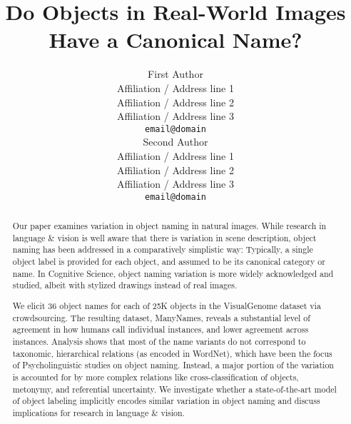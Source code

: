 \documentclass[11pt,a4paper]{article}
\title{Do Objects in Real-World Images Have a Canonical Name?}
\author{First Author \\
  Affiliation / Address line 1 \\
  Affiliation / Address line 2 \\
  Affiliation / Address line 3 \\
  {\tt email@domain} \\\And
  Second Author \\
  Affiliation / Address line 1 \\
  Affiliation / Address line 2 \\
  Affiliation / Address line 3 \\
  {\tt email@domain} \\}
\date{}
\newcommand{\cs}[1]{\textcolor{green}{\emph{//cs: #1//}}}
\begin{document}
\maketitle

\begin{abstract}
  Our paper examines variation in object naming in natural images.
  While research in language \& vision is well aware that there is variation in scene description, object naming has been addressed in a comparatively simplistic way: Typically, a single object label is provided for each object, and assumed to be its canonical category or name.
In Cognitive Science, object naming variation is more widely acknowledged and studied, albeit with stylized drawings instead of real images.

We elicit 36 object names for each of 25K objects in the VisualGenome dataset via crowdsourcing.
The resulting dataset, ManyNames, reveals a substantial level of agreement in how humans call individual instances, and lower agreement across instances.
Analysis shows that most of the name variants do not correspond to taxonomic, hierarchical relations (as encoded in WordNet), which have been the focus of Psycholinguistic studies on object naming.
Instead, a major portion of the variation is accounted for by more complex relations like cross-classification of objects,
metonymy, %
and referential uncertainty.
We investigate whether a state-of-the-art model of object labeling implicitly encodes similar variation in object naming and discuss implications for research in language \& vision.
\end{abstract}
\end{document}

